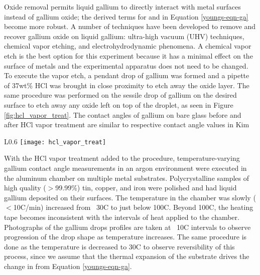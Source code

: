Oxide removal permits liquid gallium to directly interact with metal surfaces instead of gallium oxide; the derived terms for \gamSL and \gamLV in Equation \ref{youngs-eqn-ga} become more robust. A number of techniques have been developed to remove and recover gallium oxide on liquid gallium: ultra-high vacuum (UHV) techniques,\cite{Regan1995,Regan1997} chemical vapor etching,\cite{Kim2013,Doudrick2014} and electrohydrodynamic phenomena.\cite{Khan2014} A chemical vapor etch is the best option for this experiment because it has a minimal effect on the surface of metals and the experimental apparatus does not need to be changed. To execute the vapor etch, a pendant drop of gallium was formed and a pipette of 37wt\% HCl was brought in close proximity to etch away the oxide layer. The same procedure was performed on the sessile drop of gallium on the desired surface to etch away any oxide left on top of the droplet, as seen in Figure \ref{fig:hcl_vapor_treat}. The contact angles of gallium on bare glass before and after HCl vapor treatment are similar to respective contact angle values in Kim \etal\cite{Kim2013}

\begin{wrapfigure}[8]{L}{0.6\linewidth}
	\centering
	\texttt{[image: hcl\_vapor\_treat]}
	\caption{This image shows the contact angle of gallium on a bare glass slide in an argon environment before and after HCl vapor treatment.}
	\label{fig:hcl_vapor_treat}
\end{wrapfigure}

With the HCl vapor treatment added to the procedure, temperature-varying gallium contact angle measurements in an argon environment were executed in the aluminum chamber on multiple metal substrates. Polycrystalline samples of high quality ($>$99.99\%) tin, copper, and iron were polished and had liquid gallium deposited on their surfaces. The temperature in the chamber was slowly ($<$10\degree C/min) increased from ~30\degree C to just below 100\degree C. Beyond 100\degree C, the heating tape becomes inconsistent with the intervals of heat applied to the chamber. Photographs of the gallium drops profiles are taken at ~10\degree C intervals to observe progression of the drop shape as temperature increases. The same procedure is done as the temperature is decreased to 30\degree C to observe reversibility of this process, since we assume that the thermal expansion of the substrate drives the change in \gamSL from Equation \ref{youngs-eqn-ga}. 

